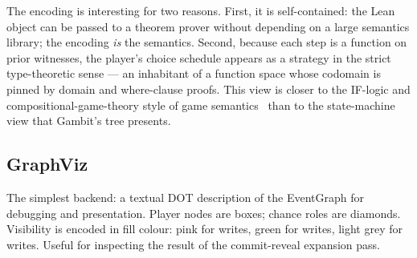 The encoding is interesting for two reasons.  First, it is
self-contained: the Lean object can be passed to a theorem
prover without depending on a large semantics library; the
encoding \emph{is} the semantics.  Second, because each step is
a function on prior witnesses, the player's choice schedule
appears as a strategy in the strict type-theoretic sense --- an
inhabitant of a function space whose codomain is pinned by
domain and where-clause proofs.  This view is closer to the
IF-logic and compositional-game-theory style of game
semantics~\citep{HintikkaSandu1989,GhaniHedgesWinschel2018CGT}
than to the state-machine view that Gambit's tree presents.

\subsection{GraphViz}

The simplest backend: a textual DOT description of the EventGraph
for debugging and presentation.  Player nodes are boxes; chance
roles are diamonds.  Visibility is encoded in fill colour: pink
for \COMMIT writes, green for \REVEAL writes, light grey for
\PUBLIC writes.  Useful for inspecting the result of the
commit-reveal expansion pass.
